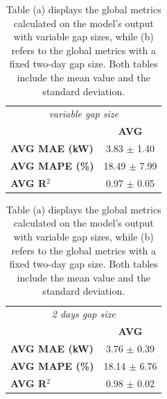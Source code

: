 \begin{table}[H]
	\begin{minipage}{.5\textwidth}
		\centering
		\begin{tabular}{l|c}
			\multicolumn{2}{c}{\textit{variable gap size}}            \\
			                       & \multicolumn{1}{c}{\textbf{AVG}} \\
			\hline
			\textbf{AVG MAE (kW)}  & 3.83 $\pm$ 1.40                  \\
			\textbf{AVG MAPE (\%)} & 18.49 $\pm$ 7.99                 \\
			\textbf{AVG R$^2$}     & 0.97 $\pm$ 0.05
		\end{tabular}
		\caption*{(a)}
	\end{minipage}%
	\begin{minipage}{.5\textwidth}
		\centering
		\begin{tabular}{l|c}
			\multicolumn{2}{c}{\textit{2 days gap size}}              \\
			                       & \multicolumn{1}{c}{\textbf{AVG}} \\
			\hline
			\textbf{AVG MAE (kW)}  & 3.76 $\pm$ 0.39                  \\
			\textbf{AVG MAPE (\%)} & 18.14 $\pm$ 6.76                 \\
			\textbf{AVG R$^2$}     & 0.98 $\pm$ 0.02
		\end{tabular}
		\caption*{(b)}
	\end{minipage}%
	\caption{Table (a) displays the global metrics calculated on the model's output with variable gap sizes, while (b) refers to the global metrics with a fixed two-day gap size. Both tables include the mean value and the standard deviation.}
	\label{tab:gabglobalmetrics}
\end{table}

